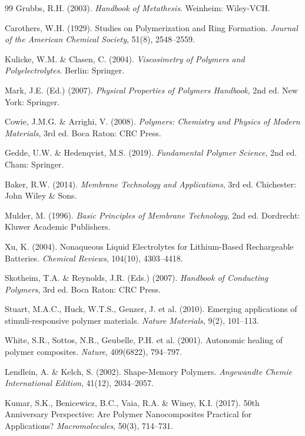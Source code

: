 \documentclass[12pt,a4paper,openany]{book}
\begin{document}
\begin{thebibliography}{99}
 Grubbs, R.H. (2003). \textit{Handbook of Metathesis}. Weinheim: Wiley-VCH.

 Carothers, W.H. (1929). Studies on Polymerization and Ring Formation. \textit{Journal of the American Chemical Society}, 51(8), 2548--2559.

 Kulicke, W.M. \& Clasen, C. (2004). \textit{Viscosimetry of Polymers and Polyelectrolytes}. Berlin: Springer.

 Mark, J.E. (Ed.) (2007). \textit{Physical Properties of Polymers Handbook}, 2nd ed. New York: Springer.

 Cowie, J.M.G. \& Arrighi, V. (2008). \textit{Polymers: Chemistry and Physics of Modern Materials}, 3rd ed. Boca Raton: CRC Press.

 Gedde, U.W. \& Hedenqvist, M.S. (2019). \textit{Fundamental Polymer Science}, 2nd ed. Cham: Springer.

 Baker, R.W. (2014). \textit{Membrane Technology and Applications}, 3rd ed. Chichester: John Wiley \& Sons.

 Mulder, M. (1996). \textit{Basic Principles of Membrane Technology}, 2nd ed. Dordrecht: Kluwer Academic Publishers.

 Xu, K. (2004). Nonaqueous Liquid Electrolytes for Lithium-Based Rechargeable Batteries. \textit{Chemical Reviews}, 104(10), 4303--4418.

 Skotheim, T.A. \& Reynolds, J.R. (Eds.) (2007). \textit{Handbook of Conducting Polymers}, 3rd ed. Boca Raton: CRC Press.

 Stuart, M.A.C., Huck, W.T.S., Genzer, J. et al. (2010). Emerging applications of stimuli-responsive polymer materials. \textit{Nature Materials}, 9(2), 101--113.

 White, S.R., Sottos, N.R., Geubelle, P.H. et al. (2001). Autonomic healing of polymer composites. \textit{Nature}, 409(6822), 794--797.

 Lendlein, A. \& Kelch, S. (2002). Shape-Memory Polymers. \textit{Angewandte Chemie International Edition}, 41(12), 2034--2057.

 Kumar, S.K., Benicewicz, B.C., Vaia, R.A. \& Winey, K.I. (2017). 50th Anniversary Perspective: Are Polymer Nanocomposites Practical for Applications? \textit{Macromolecules}, 50(3), 714--731.


\end{thebibliography}
\end{document}
